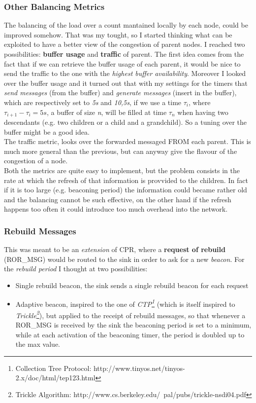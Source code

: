 \documentclass{article}
\begin{document}
		\subsubsection{Other Balancing Metrics}
		\label{sec:balancingMetrics}
The balancing of the load over a count mantained locally by each node, could be improved somehow. That was my tought, so I started thinking what can be exploited to have a better view of the congestion of parent nodes. I reached two possibilities: \textbf{buffer usage} and \textbf{traffic} of parent. The first idea comes from the fact that if we can retrieve the buffer usage of each parent, it would be nice to send the traffic to the one with the \emph{highest buffer availability}. Moreover I looked over the buffer usage and it turned out that with my settings for the timers that \emph{send messages} (from the buffer) and \emph{generate messages} (insert in the buffer), which are respectively set to \textit{5s} and \textit{10,5s}, if we use a time $\tau_i$, where $\tau_{i+1}-\tau_{i}=5s$, a buffer of size \emph{n}, will be filled at time $\tau_n$ when having two descendants (e.g. two children or a child and a grandchild). So a tuning over the buffer might be a good idea.
\\ The traffic metric, looks over the forwarded messaged FROM each parent. This is much more general than the previous, but can anyway give the flavour of the congestion of a node.
\\Both the metrics are quite easy to implement, but the problem consists in the rate at which the refresh of that information is provvided to the children. In fact if it is too large (e.g. beaconing period) the information could became rather old and the balancing cannot be such effective, on the other hand if the refresh happens too often it could introduce too much overhead into the network.

		\subsubsection{Rebuild Messages}
			\label{sec:rebuildMessages}
This was meant to be an \textit{extension} of CPR, where a \textbf{request of rebuild} (ROR\_MSG) would be routed to the sink in order to ask for a new \emph{beacon}. For the \textit{rebuild period} I thought at two possibilities:
			\begin{itemize}
				\item Single rebuild beacon, the sink sends a single rebuild beacon for each request
				\item Adaptive beacon, inspired to the one of \emph{CTP\footnote{Collection Tree Protocol: http://www.tinyos.net/tinyos-2.x/doc/html/tep123.html}} (which is itself inspired to \emph{Trickle\footnote{Trickle Algorithm: http://www.cs.berkeley.edu/~pal/pubs/trickle-nsdi04.pdf}}), but applied to the receipt of rebuild messages, so that whenever a ROR\_MSG is received by the sink the beaconing period is set to a minimum, while at each activation of the beaconing timer, the period is doubled up to the max value.
			\end{itemize}
		
\end{document}
